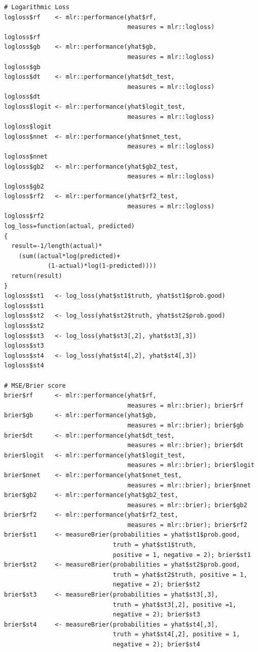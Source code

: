 \documentclass[12pt]{article}
\begin{document}
\begin{lstlisting}
# Logarithmic Loss
logloss$rf    <- mlr::performance(yhat$rf, 
                                  measures = mlr::logloss)
logloss$rf
logloss$gb    <- mlr::performance(yhat$gb, 
                                  measures = mlr::logloss)
logloss$gb
logloss$dt    <- mlr::performance(yhat$dt_test, 
                                  measures = mlr::logloss)
logloss$dt
logloss$logit <- mlr::performance(yhat$logit_test,
                                  measures = mlr::logloss)
logloss$logit
logloss$nnet  <- mlr::performance(yhat$nnet_test, 
                                  measures = mlr::logloss)
logloss$nnet
logloss$gb2   <- mlr::performance(yhat$gb2_test, 
                                  measures = mlr::logloss)
logloss$gb2
logloss$rf2   <- mlr::performance(yhat$rf2_test, 
                                  measures = mlr::logloss)
logloss$rf2
log_loss=function(actual, predicted)
{
  result=-1/length(actual)*
    (sum((actual*log(predicted)+
            (1-actual)*log(1-predicted))))
  return(result)
}
logloss$st1   <- log_loss(yhat$st1$truth, yhat$st1$prob.good)
logloss$st1
logloss$st2   <- log_loss(yhat$st2$truth, yhat$st2$prob.good)
logloss$st2
logloss$st3   <- log_loss(yhat$st3[,2], yhat$st3[,3])
logloss$st3
logloss$st4   <- log_loss(yhat$st4[,2], yhat$st4[,3])
logloss$st4

# MSE/Brier score
brier$rf      <- mlr::performance(yhat$rf, 
                                  measures = mlr::brier); brier$rf
brier$gb      <- mlr::performance(yhat$gb, 
                                  measures = mlr::brier); brier$gb
brier$dt      <- mlr::performance(yhat$dt_test, 
                                  measures = mlr::brier); brier$dt
brier$logit   <- mlr::performance(yhat$logit_test,
                                  measures = mlr::brier); brier$logit
brier$nnet    <- mlr::performance(yhat$nnet_test, 
                                  measures = mlr::brier); brier$nnet
brier$gb2     <- mlr::performance(yhat$gb2_test, 
                                  measures = mlr::brier); brier$gb2
brier$rf2     <- mlr::performance(yhat$rf2_test, 
                                  measures = mlr::brier); brier$rf2
brier$st1     <- measureBrier(probabilities = yhat$st1$prob.good, 
                              truth = yhat$st1$truth, 
                              positive = 1, negative = 2); brier$st1
brier$st2     <- measureBrier(probabilities = yhat$st2$prob.good, 
                              truth = yhat$st2$truth, positive = 1, 
                              negative = 2); brier$st2
brier$st3     <- measureBrier(probabilities = yhat$st3[,3], 
                              truth = yhat$st3[,2], positive =1, 
                              negative = 2); brier$st3
brier$st4     <- measureBrier(probabilities = yhat$st4[,3], 
                              truth = yhat$st4[,2], positive = 1, 
                              negative = 2); brier$st4


\end{lstlisting}
\end{document}
